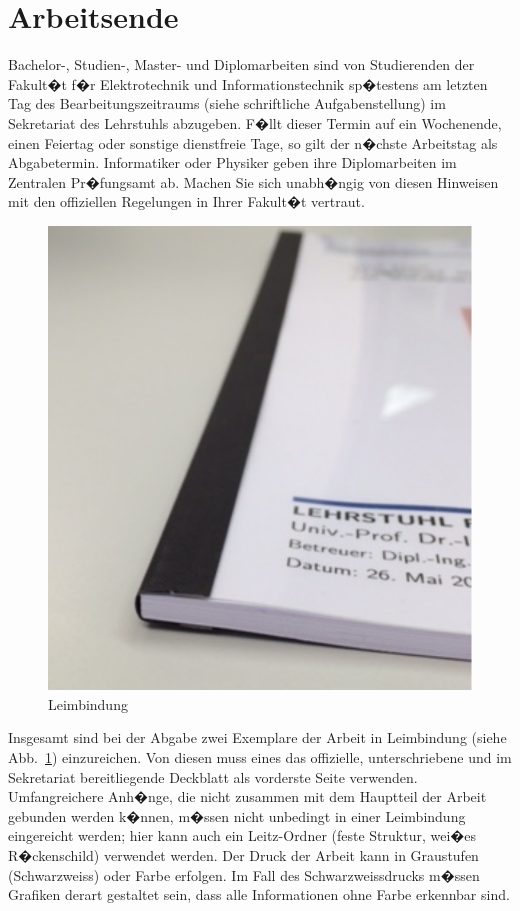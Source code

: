 \section{Arbeitsende}
Bachelor-, Studien-, Master- und Diplomarbeiten sind von Studierenden der Fakult�t f�r Elektrotechnik und Informationstechnik sp�testens am letzten Tag des Bearbeitungszeitraums (siehe schriftliche Aufgabenstellung) im Sekretariat des Lehrstuhls abzugeben. F�llt dieser Termin auf ein Wochenende, einen Feiertag oder sonstige dienstfreie Tage, so gilt der n�chste Arbeitstag als Abgabetermin. Informatiker oder Physiker geben ihre Diplomarbeiten im Zentralen Pr�fungsamt ab. Machen Sie sich unabh�ngig von diesen Hinweisen mit den offiziellen Regelungen in Ihrer Fakult�t vertraut.

\begin{figure}[!ht]
	\centering
	\includegraphics[scale=0.6]{images/leimbindung}
	\caption{Leimbindung}
	\label{fig:Leimbindung}
\end{figure}
Insgesamt sind bei der Abgabe zwei Exemplare der Arbeit in Leimbindung (siehe Abb.~\ref{fig:Leimbindung}) einzureichen. Von diesen muss eines das offizielle, unterschriebene und im Sekretariat bereitliegende Deckblatt als vorderste Seite verwenden.
Umfangreichere Anh�nge, die nicht zusammen mit dem Hauptteil der Arbeit gebunden werden k�nnen, m�ssen nicht unbedingt in einer Leimbindung eingereicht werden; hier kann auch ein Leitz-Ordner (feste Struktur, wei�es R�ckenschild) verwendet werden.
Der Druck der Arbeit kann in Graustufen (Schwarzweiss) oder Farbe erfolgen. Im Fall des Schwarzweissdrucks m�ssen Grafiken derart gestaltet sein, dass alle Informationen ohne Farbe erkennbar sind.



